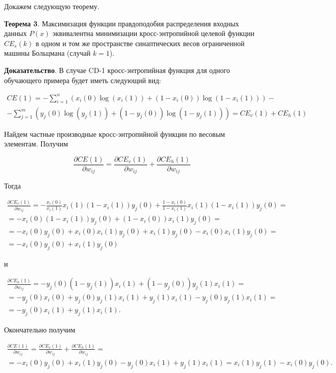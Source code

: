 Докажем следующую теорему.

\textbf{Теорема 3}. Максимизация функции правдоподобия распределения входных данных $P(x)$ эквивалентна минимизации кросс-энтропийной целевой функции $CE_s(k)$ в одном и том же пространстве синаптических весов ограниченной машины Больцмана (случай $k=1$).

\textbf{Доказательство}. В случае CD-1 кросс-энтропийная функция для одного обучающего примера будет иметь следующий вид:

\begin{multline}
	CE(1) = -\sum_{i=1}^n (x_i(0)\log(x_i(1))+(1-x_i(0))\log(1-x_i(1)))-\\-\sum_{j=1}^m ( y_j(0)\log(y_j(1))+(1-y_j(0))\log(1-y_j(1))) = CE_v(1)+CE_h(1)
\end{multline}

Найдем частные производные кросс-энтропийной функции по весовым элементам. Получим

\begin{equation*}
	\frac{\partial CE(1)}{\partial w_{ij}} = \frac{\partial CE_v(1)}{\partial w_{ij}} + \frac{\partial CE_h(1)}{\partial w_{ij}}
\end{equation*}

Тогда

\begin{multline*}
	\frac{\partial CE_v(1)}{\partial w_{ij}} = -\frac{x_i(0)}{x_i(1)}x_i(1)(1-x_i(1))y_j(0)+\frac{1-x_i(0)}{1-x_i(1)}x_i(1)(1-x_i(1))y_j(0) = \\ = -x_i(0)(1-x_i(1))y_j(0)+(1-x_i(0))x_i(1)y_j(0)=\\=-x_i(0)y_j(0)+x_i(0)x_i(1)y_j(0)+x_i(1)y_j(0)-x_i(0)x_i(1)y_j(0)=\\=-x_i(0)y_j(0)+x_i(1)y_j(0) 
\end{multline*}

и

\begin{multline*}
	\frac{\partial CE_h(1)}{\partial w_{ij}} = -y_j(0)(1-y_j(1))x_i(1)+(1-y_j(0))y_j(1)x_i(1) = \\ = -y_j(0)x_i(0)+y_j(0)y_j(1)x_i(1)+y_j(1)x_i(1)-y_j(0)y_j(1)x_i(1) = \\ = -y_j(0)x_i(1)+y_j(1)x_i(1). 
\end{multline*}

Окончательно получим

\begin{multline*}
	\frac{\partial CE(1)}{\partial w_{ij}} = \frac{\partial CE_v(1)}{\partial w_{ij}} + \frac{\partial CE_h(1)}{\partial w_{ij}} = \\ = -x_i(0)y_j(0)+x_i(1)y_j(0) -y_j(0)x_i(1)+y_j(1)x_i(1) = x_i(1)y_j(1) - x_i(0)y_j(0).
\end{multline*}

